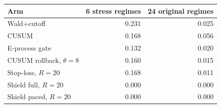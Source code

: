 \begin{tabular}{@{}l r r@{}}
\toprule
Arm & 6 stress regimes & 24 original regimes \\
\midrule
Wald+cutoff & 0.231 & 0.025 \\
CUSUM & 0.168 & 0.056 \\
E-process gate & 0.132 & 0.020 \\
CUSUM rollback, $\theta=8$ & 0.160 & 0.015 \\
Stop-loss, $R=20$ & 0.168 & 0.011 \\
Shield full, $R=20$ & 0.000 & 0.000 \\
Shield paced, $R=20$ & 0.000 & 0.000 \\
\bottomrule
\end{tabular}

